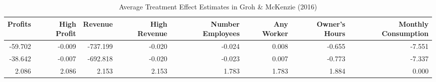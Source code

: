 \begin{table}[ht]
\centering
\begin{tabular}{rrrrrrrr}
  \hline
Profits & High Profit & Revenue & High Revenue & Number Employees & Any Worker & Owner's Hours & Monthly Consumption \\ 
  \hline
-59.702 & -0.009 & -737.199 & -0.020 & -0.024 & 0.008 & -0.655 & -7.551 \\ 
  -38.642 & -0.007 & -692.818 & -0.020 & -0.023 & 0.007 & -0.773 & -7.337 \\ 
  2.086 & 2.086 & 2.153 & 2.153 & 1.783 & 1.783 & 1.884 & 0.000 \\ 
  \end{tabular}
\caption{Average Treatment Effect Estimates in Groh \& McKenzie (2016)} 
\end{table}
